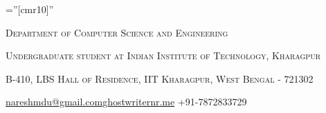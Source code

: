 \documentclass[a4paper,10pt]{extarticle} %
\begin{document}
\pagestyle{empty} %

\font\fb=''[cmr10]'' %


\par{\par} %
\par{\centering\large {\textsc{Department of Computer Science and Engineering}}\par}\large
\par{\centering\large {\textsc{Undergraduate student at Indian Institute of Technology, Kharagpur}}\par}\large
\par{\centering\large {\textsc{B-410, LBS Hall of Residence, IIT Kharagpur, West Bengal - 721302}}\par}\large
\hspace{3.5cm}\normalsize {\href{mailto:nareshmdu@gmail.com}{nareshmdu@gmail.com}}\hfill \normalsize {\href{http://ghostwriternr.me/}{ghostwriternr.me}} \hfill {+91-7872833729}\hspace{3.5cm}




\end{document}
